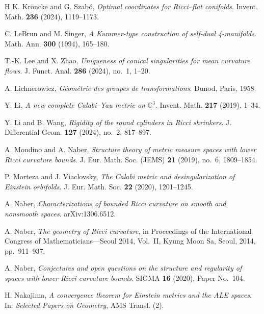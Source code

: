 \documentclass[11pt,reqno]{amsart}
\numberwithin{equation}{section}
\theoremstyle{definition}
\theoremstyle{remark}
\begin{document}
\begin{thebibliography}{H}
K. Kröncke and G. Szabó,
\textit{Optimal coordinates for Ricci--flat conifolds}.
Invent. Math. \textbf{236} (2024), 1119--1173.

C. LeBrun and M. Singer,
\textit{A Kummer-type construction of self-dual 4-manifolds}.
Math. Ann. \textbf{300} (1994), 165--180.

T.-K. Lee and X. Zhao,
\textit{Uniqueness of conical singularities for mean curvature flows}.
J. Funct. Anal. \textbf{286} (2024), no.~1, 1--20.

A. Lichnerowicz,
\textit{Géométrie des groupes de transformations}.
Dunod, Paris, 1958.

Y. Li,
\textit{A new complete Calabi--Yau metric on $\mathbb{C}^3$}.
Invent. Math. \textbf{217} (2019), 1--34.

Y. Li and B. Wang,
\textit{Rigidity of the round cylinders in Ricci shrinkers}.
J. Differential Geom. \textbf{127} (2024), no.~2, 817--897.

A. Mondino and A. Naber,
\textit{Structure theory of metric measure spaces with lower Ricci curvature bounds}.
J. Eur. Math. Soc. (JEMS) \textbf{21} (2019), no.~6, 1809--1854.

P. Morteza and J. Viaclovsky,
\textit{The Calabi metric and desingularization of Einstein orbifolds}.
J. Eur. Math. Soc. \textbf{22} (2020), 1201--1245.

A. Naber,
\textit{Characterizations of bounded Ricci curvature on smooth and nonsmooth spaces}.
arXiv:1306.6512.

A. Naber,
\textit{The geometry of Ricci curvature},
in Proceedings of the International Congress of Mathematicians---Seoul 2014, Vol.~II,
Kyung Moon Sa, Seoul, 2014, pp.~911--937.

A. Naber,
\textit{Conjectures and open questions on the structure and regularity of spaces with lower Ricci curvature bounds}.
SIGMA \textbf{16} (2020), Paper No.~104.

H. Nakajima,
\textit{A convergence theorem for Einstein metrics and the ALE spaces}.
In: \emph{Selected Papers on Geometry}, AMS Transl. (2).



\end{thebibliography}
\end{document}
